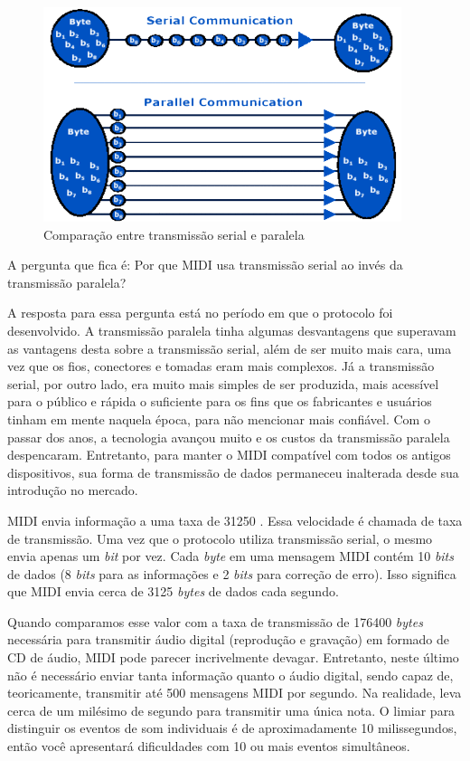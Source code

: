             \begin{figure}[H]
            	\centering
            	\includegraphics[scale=0.8]{Imagens/Parallel_versus_serial_transmissions.png}
            	\caption[Comparação entre transmissão serial e paralela]{Comparação entre transmissão serial e paralela}
            	\label{fig:Parallel_versus_serial_transmissions}
            \end{figure}

            A pergunta que fica é: Por que MIDI usa transmissão serial ao invés da transmissão paralela?

            A resposta para essa pergunta está no período em que o protocolo foi desenvolvido. A transmissão paralela tinha algumas desvantagens que superavam as vantagens desta sobre a transmissão serial, além de ser muito mais cara, uma vez que os fios, conectores e tomadas eram mais complexos. Já a transmissão serial, por outro lado, era muito mais simples de ser produzida, mais acessível para o público e rápida o suficiente para os fins que os fabricantes e usuários tinham em mente naquela época, para não mencionar mais confiável. Com o passar dos anos, a tecnologia avançou muito e os custos da transmissão paralela despencaram. Entretanto, para manter o MIDI compatível com todos os antigos dispositivos, sua forma de transmissão de dados permaneceu inalterada desde sua introdução no mercado.

            MIDI envia informação a uma taxa de 31250 . Essa velocidade é chamada de taxa de transmissão. Uma vez que o protocolo utiliza transmissão serial, o mesmo envia apenas um \textit{bit} por vez. Cada \textit{byte} em uma mensagem MIDI contém 10 \textit{bits} de dados (8 \textit{bits} para as informações e 2 \textit{bits} para correção de erro). Isso significa que MIDI envia cerca de 3125 \textit{bytes} de dados cada segundo.

            Quando comparamos esse valor com a taxa de transmissão de 176400 \textit{bytes} necessária para transmitir áudio digital (reprodução e gravação) em formado de CD de áudio, MIDI pode parecer incrivelmente devagar. Entretanto, neste último não é necessário enviar tanta informação quanto o áudio digital, sendo capaz de, teoricamente, transmitir até 500 mensagens MIDI por segundo. Na realidade, leva cerca de um milésimo de segundo para transmitir uma única nota. O limiar para distinguir os eventos de som individuais é de aproximadamente 10 milissegundos, então você apresentará dificuldades com 10 ou mais eventos simultâneos.

